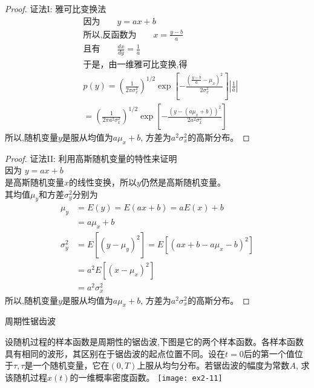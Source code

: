 \begin{frame}
\begin{proof}
	证法I: 雅可比变换法
	\begin{align*}
		&\text{因为}\qquad  y=ax+b \\
		&\text{所以,反函数为}\qquad  x=\frac{y-b}{a} \\
		&\text{且有}\qquad  \frac{dx}{dy}=\frac{1}{a} \\
		&\text{于是，由一维雅可比变换,得}  \\
		&p(y)=\left(\frac{1}{2\pi\sigma_x^2}\right)^{1/2}\exp\left[-\frac{(\frac{y-b}{a}-\mu_x)^2}{2\sigma_x^2}\right]\left|\frac{1}{a}\right| \\
		&=\left(\frac{1}{2\pi  a^2\sigma_x^2}\right)^{1/2}\exp\left[-\frac{(y-(a\mu_x+b))^2}{2a^2\sigma_x^2}\right]  
	\end{align*}
	所以,随机变量$y$是服从均值为$a\mu_x+b$, 方差为$a^2\sigma_x^2$的高斯分布。
\end{proof}
\end{frame}

\begin{frame}
\begin{proof}
	证法II: 利用高斯随机变量的特性来证明\\
	因为  $y=ax+b$ \\
	是高斯随机变量$x$的线性变换，所以$y$仍然是高斯随机变量。\\
	其均值$\mu_y$和方差$\sigma_y^2$分别为
	\begin{align*}
	\mu_y&=E(y)=E(ax+b)=aE(x)+b\\
	&=a\mu_x+b\\
	\sigma_y^2&=E[(y-\mu_y)^2]=E[(ax+b-a\mu_x-b)^2]\\
	&=a^2E[(x-\mu_x)^2]\\
	&=a^2\sigma_x^2
	\end{align*}
	所以,随机变量$y$是服从均值为$a\mu_x+b$, 方差为$a^2\sigma_x^2$的高斯分布。
\end{proof}
\end{frame}

\begin{frame}{周期性锯齿波}
\begin{example}
设随机过程的样本函数是周期性的锯齿波,下图是它的两个样本函数。各样本函数具有相同的波形，其区别在于锯齿波的起点位置不同。设在$t=0$后的第一个值位于$\tau,\tau$是一个随机变量，它在$(0,T)$上服从均匀分布。若锯齿波的幅度为常数$A$, 求该随机过程$x(t)$的一维概率密度函数。
\texttt{[image: ex2-11]}
\end{example}
\end{frame}

